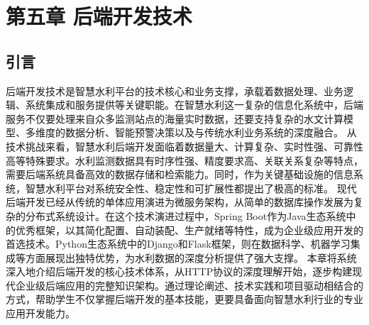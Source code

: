 \section{第五章 后端开发技术}\label{ux7b2cux4e94ux7ae0-ux540eux7aefux5f00ux53d1ux6280ux672f} \learningobjectives{
}\subsection{引言}\label{ux5f15ux8a00}
后端开发技术是智慧水利平台的技术核心和业务支撑，承载着数据处理、业务逻辑、系统集成和服务提供等关键职能。在智慧水利这一复杂的信息化系统中，后端服务不仅要处理来自众多监测站点的海量实时数据，还要支持复杂的水文计算模型、多维度的数据分析、智能预警决策以及与传统水利业务系统的深度融合。
从技术挑战来看，智慧水利后端开发面临着数据量大、计算复杂、实时性强、可靠性高等特殊要求。水利监测数据具有时序性强、精度要求高、关联关系复杂等特点，需要后端系统具备高效的数据存储和检索能力。同时，作为关键基础设施的信息系统，智慧水利平台对系统安全性、稳定性和可扩展性都提出了极高的标准。
现代后端开发已经从传统的单体应用演进为微服务架构，从简单的数据库操作发展为复杂的分布式系统设计。在这个技术演进过程中，Spring
Boot作为Java生态系统中的优秀框架，以其简化配置、自动装配、生产就绪等特性，成为企业级应用开发的首选技术。Python生态系统中的Django和Flask框架，则在数据科学、机器学习集成等方面展现出独特优势，为水利数据的深度分析提供了强大支撑。
本章将系统深入地介绍后端开发的核心技术体系，从HTTP协议的深度理解开始，逐步构建现代企业级后端应用的完整知识架构。通过理论阐述、技术实践和项目驱动相结合的方式，帮助学生不仅掌握后端开发的基本技能，更要具备面向智慧水利行业的专业应用开发能力。

